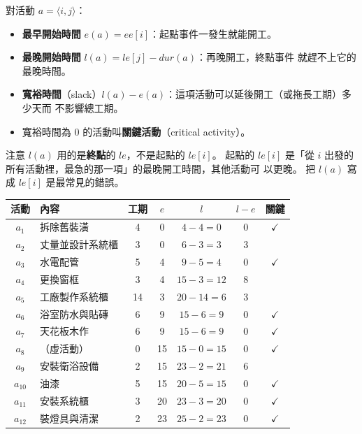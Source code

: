 對活動 $a = \langle i, j \rangle$：
\begin{itemize}
\item \textbf{最早開始時間} $e(a) = \mathit{ee}[i]$：起點事件一發生就能開工。
\item \textbf{最晚開始時間} $l(a) = \mathit{le}[j] - \mathit{dur}(a)$：再晚開工，終點事件
就趕不上它的最晚時間。
\item \textbf{寬裕時間}（slack）$l(a) - e(a)$：這項活動可以延後開工（或拖長工期）多少天而
不影響總工期。
\item 寬裕時間為 $0$ 的活動叫\textbf{關鍵活動}（critical activity）。
\end{itemize}
注意 $l(a)$ 用的是\textbf{終點}的 $\mathit{le}$，不是起點的 $\mathit{le}[i]$。 起點的
$\mathit{le}[i]$ 是「從 $i$ 出發的所有活動裡，最急的那一項」的最晚開工時間，其他活動可
以更晚。 把 $l(a)$ 寫成 $\mathit{le}[i]$ 是最常見的錯誤。

\begin{center}
\small
\begin{tabular}{clccccc}
\toprule
活動 & 內容 & 工期 & $e$ & $l$ & $l - e$ & 關鍵 \\
\midrule
$a_1$ & 拆除舊裝潢 & 4 & 0 & $4 - 4 = 0$ & 0 & $\checkmark$ \\
$a_2$ & 丈量並設計系統櫃 & 3 & 0 & $6 - 3 = 3$ & 3 & \\
$a_3$ & 水電配管 & 5 & 4 & $9 - 5 = 4$ & 0 & $\checkmark$ \\
$a_4$ & 更換窗框 & 3 & 4 & $15 - 3 = 12$ & 8 & \\
$a_5$ & 工廠製作系統櫃 & 14 & 3 & $20 - 14 = 6$ & 3 & \\
$a_6$ & 浴室防水與貼磚 & 6 & 9 & $15 - 6 = 9$ & 0 & $\checkmark$ \\
$a_7$ & 天花板木作 & 6 & 9 & $15 - 6 = 9$ & 0 & $\checkmark$ \\
$a_8$ & （虛活動） & 0 & 15 & $15 - 0 = 15$ & 0 & $\checkmark$ \\
$a_9$ & 安裝衛浴設備 & 2 & 15 & $23 - 2 = 21$ & 6 & \\
$a_{10}$ & 油漆 & 5 & 15 & $20 - 5 = 15$ & 0 & $\checkmark$ \\
$a_{11}$ & 安裝系統櫃 & 3 & 20 & $23 - 3 = 20$ & 0 & $\checkmark$ \\
$a_{12}$ & 裝燈具與清潔 & 2 & 23 & $25 - 2 = 23$ & 0 & $\checkmark$ \\
\bottomrule
\end{tabular}
\end{center}

